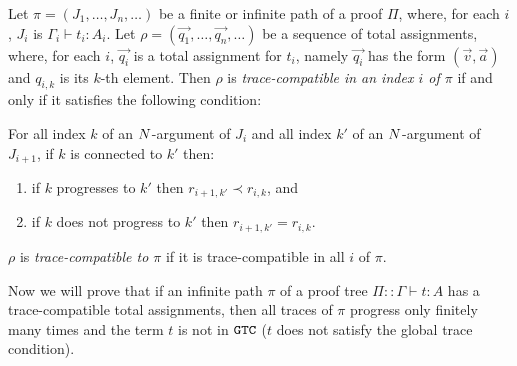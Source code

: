 
\begin{definition}\label{definition-trace-compatible}
  Let $\pi  = (J_1,\ldots,J_n,\ldots)$ be a finite or infinite path of a proof $\Pi$,
  where, for each $i$, $J_i$ is $\Gamma_i\vdash t_i:A_i$. 
  Let $\rho = (\vec{q_1}, \ldots, \vec{q_n}, \ldots)$ be a sequence of total assignments,
  where, for each $i$, $\vec{q_i}$ is a total assignment for $t_i$,
  namely $\vec{q_i}$ has the form $(\vec{v},\vec{a})$ and $q_{i,k}$ is its $k$-th element. 
  Then $\rho$ is \emph{trace-compatible in an index $i$ of $\pi$}
  if and only if it satisfies the following condition:

For all index $k$ of an ${N}$-argument of $J_i$ and  
all index $k'$ of an ${N}$-argument of $J_{i+1}$, 
if $k$ is connected to $k'$ then:
\begin{enumerate}
\item
  if $k$ progresses to $k'$ then $r_{i+1,k'} \prec r_{i,k}$, and
\item
  if $k$ does not progress to $k'$ then $r_{i+1,k'} = r_{i,k}$.
\end{enumerate}
$\rho$ is \emph{trace-compatible to $\pi$} if it is trace-compatible in all $i$ of $\pi$.
\end{definition}


Now we will prove that if an infinite path $\pi$ of a proof tree $\Pi::\Gamma \vdash t:A$ 
has a trace-compatible total assignments, 
then all traces of $\pi$ progress only finitely many times and the term 
$t$ is not in ${\tt GTC}$
($t$ does not satisfy the global trace condition).

